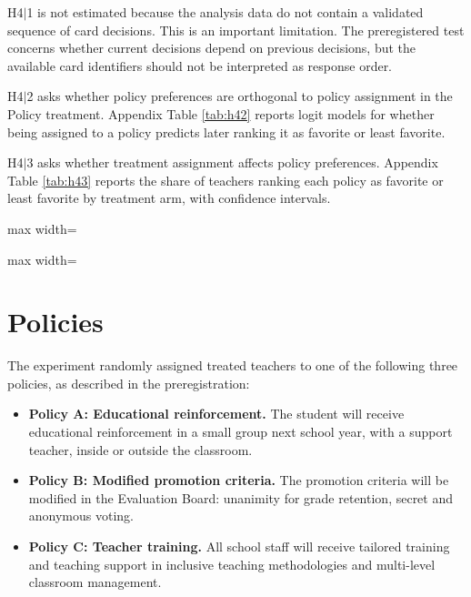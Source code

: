 \documentclass[12pt,a4paper]{article}
\newcommand{\tabpath}{../3. Output/tables/}
\begin{document}
H4\(|\)1 is not estimated because the analysis data do not contain a validated sequence of card decisions. This is an important limitation. The preregistered test concerns whether current decisions depend on previous decisions, but the available card identifiers should not be interpreted as response order.

H4\(|\)2 asks whether policy preferences are orthogonal to policy assignment in the Policy treatment. Appendix Table \ref{tab:h42} reports logit models for whether being assigned to a policy predicts later ranking it as favorite or least favorite.

H4\(|\)3 asks whether treatment assignment affects policy preferences. Appendix Table \ref{tab:h43} reports the share of teachers ranking each policy as favorite or least favorite by treatment arm, with confidence intervals.



\begin{table}[H]
\centering
\caption{H4\(|\)2: Policy assignment and later policy preferences}
\label{tab:h42}
\begin{adjustbox}{max width=\textwidth}

\end{adjustbox}
\end{table}

\begin{table}[H]
\centering
\caption{H4\(|\)3: Policy preferences by treatment arm}
\label{tab:h43}
\begin{adjustbox}{max width=\textwidth}

\end{adjustbox}
\end{table}

\section{Policies}\label{app:policy}

The experiment randomly assigned treated teachers to one of the following three policies, as described in the preregistration:

\begin{itemize}
\item \textbf{Policy A: Educational reinforcement.} The student will receive educational reinforcement in a small group next school year, with a support teacher, inside or outside the classroom.
\item \textbf{Policy B: Modified promotion criteria.} The promotion criteria will be modified in the Evaluation Board: unanimity for grade retention, secret and anonymous voting.
\item \textbf{Policy C: Teacher training.} All school staff will receive tailored training and teaching support in inclusive teaching methodologies and multi-level classroom management.
\end{itemize}
\end{document}
